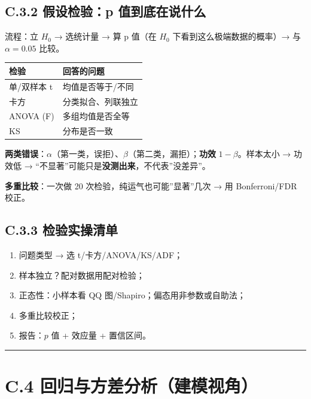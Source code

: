 \subsection{C.3.2 假设检验：p
值到底在说什么}\label{c.3.2-ux5047ux8bbeux68c0ux9a8cp-ux503cux5230ux5e95ux5728ux8bf4ux4ec0ux4e48}

流程：立 \(H_0\) → 选统计量 → 算 p 值（在 \(H_0\)
下看到这么极端数据的概率）→ 与 \(\alpha=0.05\) 比较。

{\def\LTcaptype{none} %
\begin{longtable}[]{@{}ll@{}}
\toprule\noalign{}
检验 & 回答的问题 \\
\midrule\noalign{}
\endhead
\bottomrule\noalign{}
\endlastfoot
单/双样本 t & 均值是否等于/不同 \\
卡方 & 分类拟合、列联独立 \\
ANOVA (F) & 多组均值是否全等 \\
KS & 分布是否一致 \\
\end{longtable}
}

\textbf{两类错误}：\(\alpha\)（第一类，误拒）、\(\beta\)（第二类，漏拒）；\textbf{功效}
\(1-\beta\)。样本太小 → 功效低 →
``不显著''可能只是\textbf{没测出来}，不代表''没差异''。

\textbf{多重比较}：一次做 20 次检验，纯运气也可能''显著''几次 → 用
Bonferroni/FDR 校正。

\subsection{C.3.3
检验实操清单}\label{c.3.3-ux68c0ux9a8cux5b9eux64cdux6e05ux5355}

\begin{enumerate}
\def\labelenumi{\arabic{enumi}.}
\tightlist
\item
  问题类型 → 选 t/卡方/ANOVA/KS/ADF；
\item
  样本独立？配对数据用配对检验；
\item
  正态性：小样本看 QQ 图/Shapiro；偏态用非参数或自助法；
\item
  多重比较校正；
\item
  报告：\(p\) 值 + 效应量 + 置信区间。
\end{enumerate}

\begin{center}\rule{0.5\linewidth}{0.5pt}\end{center}

\section{C.4
回归与方差分析（建模视角）}\label{c.4-ux56deux5f52ux4e0eux65b9ux5deeux5206ux6790ux5efaux6a21ux89c6ux89d2}

